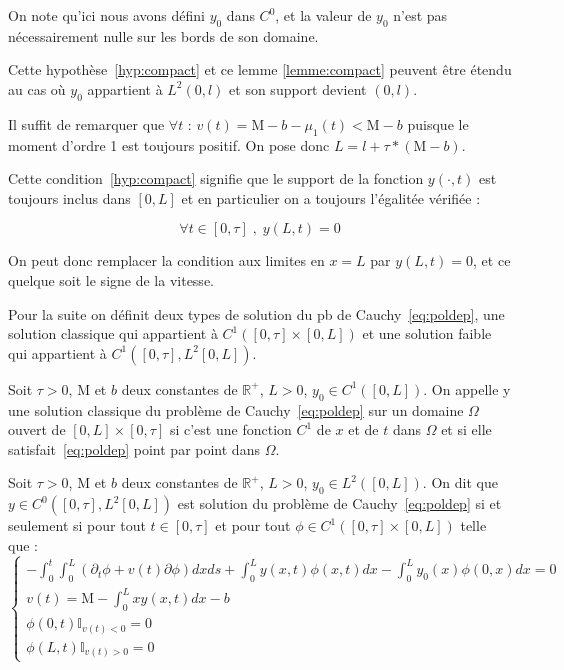 \documentclass[a4paper]{article}
\newcommand{\mass}{\mathrm{M}}
\newcommand{\dep}{b}
\begin{document}
\begin{remarque}
	On note qu'ici nous avons défini $y_0$ dans $C^0$, et la valeur de $y_0$ n'est pas nécessairement nulle sur les bords de son domaine.
	
	Cette hypothèse~\eqref{hyp:compact} et ce lemme \ref{lemme:compact} peuvent être étendu au cas où $y_0$ appartient à $L^2(0,l)$ et son support devient $(0,l)$.
\end{remarque}

\begin{preuve}
	Il suffit de remarquer que $\forall t$ :
	$v(t) = \mass - \dep - \mu_1 (t) < \mass - \dep $
	puisque le moment d'ordre 1 est toujours positif.
	On pose donc $L = l + \tau*(\mass-\dep)$.
\end{preuve}

Cette condition~\eqref{hyp:compact} signifie que le support de la fonction $y( \cdot,t)$ est toujours inclus dans $[0,L]$ et en particulier on a toujours l'égalitée vérifiée : 

\[ \forall t \in [0,\tau] \;, \; y(L,t) =0\]

On peut donc remplacer la condition aux limites en $x=L$ par $y(L,t)=0$, et ce quelque soit le signe de la vitesse.

Pour la suite on définit deux types de solution du pb de Cauchy~\eqref{eq:poldep}, une solution classique qui appartient à $C^1([0,\tau]\times[0,L])$ 
et une solution faible qui appartient à $C^1([0,\tau],L^2[0,L])$.

\begin{definition}
	Soit $\tau>0$, $\mass$ et $\dep$ deux constantes de $\mathbb{R}^+$, $L>0$, $y_0 \in C^1([0,L])$.
	On appelle y une solution classique du problème de Cauchy~\eqref{eq:poldep} 
	sur un domaine $\Omega$ ouvert de $[0,L] \times [0, \tau]$ 
	si c'est une fonction $C^1$ de $x$ et de $t$ dans $\Omega$ 
	et si elle satisfait~\eqref{eq:poldep} point par point dans $\Omega$.
\end{definition}

\begin{definition}
	\label{def:cauchy}
	Soit $\tau>0$, $\mass$ et $\dep$ deux constantes de $\mathbb{R}^+$, 
	$L>0$, $y_0 \in L^2([0,L])$.
	On dit que $y \in C^0([0,\tau],L^2[0,L])$ est solution du problème de Cauchy~\eqref{eq:poldep}  
	si et seulement si pour tout $t \in [0,\tau]$ et pour
	tout $\phi \in C^1([0,\tau]\times [0,L])$ telle que :
	\begin{equation}
		\begin{cases}
			-\int_0^t \int_0^L (\partial_t \phi +v(t)\partial \phi) dxds 
			+ \int_0^L y(x,t) \phi (x,t) dx - \int_0^L y_0(x)\phi(0,x)dx =0 \\
			v(t) = \mass - \int_0^L xy(x,t)dx -\dep\\
			\phi(0,t) \mathbb{I}_{v(t)<0}=0 \\
			\phi(L,t) \mathbb{I}_{v(t)>0}=0 
		\end{cases}
	\end{equation}
\end{definition}
\end{document}
